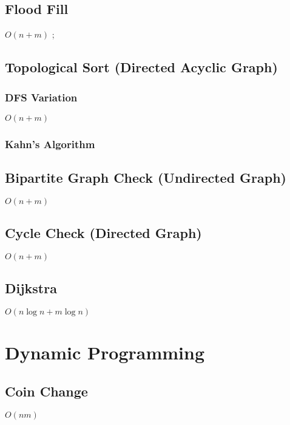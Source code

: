 \documentclass{article}
\begin{document}
\subsection{Flood Fill}
$O(n+m)$
;

\subsection{Topological Sort (Directed Acyclic Graph)}
\subsubsection{DFS Variation}
$O(n+m)$


\subsubsection{Kahn's Algorithm}


\subsection{Bipartite Graph Check (Undirected Graph)}
$O(n+m)$


\subsection{Cycle Check (Directed Graph)}
$O(n+m)$


\subsection{Dijkstra}
$O(n \log n + m\log n)$


\section{Dynamic Programming}
\subsection{Coin Change}
$O(nm)$

\end{document}
